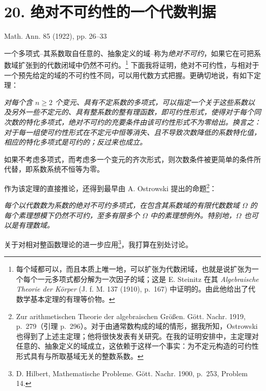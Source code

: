 \setcounter{footnote}{0}
\section*{20. 绝对不可约性的一个代数判据}
\begin{center}
Math. Ann. 85 (1922), pp. 26--33
\end{center}

一个多项式--其系数取自任意的、抽象定义的域--称为\emph{绝对不可约}，如果它在可把系数域扩张到的代数闭域中仍然不可约。\footnote{每个域都可以，而且本质上唯一地，可以扩张为代数闭域，也就是说扩张为一个每个一元多项式都分解为一次因子的域；这是 E. Steinitz 在其 \emph{Algebraische Theorie der K\"orper} (J. f. M. 137 (1910), p.~167) 中证明的。由此他给出了代数学基本定理的有理等价物。} 下面我将证明，绝对不可约性，与相对于一个预先给定的域的不可约性不同，可以用代数方式把握。更确切地说，有如下定理：

\emph{对每个含 $n\ge2$ 个变元、具有不定系数的多项式，可以指定一个关于这些系数以及另外一些不定元的、具有整系数的整有理函数，即可约性形式，使得对于每个同次数的特化多项式，绝对不可约的充要条件由该可约性形式不为零给出。换言之：对于每一组使可约性形式在不定元中恒等消失、且不导致次数降低的系数特化值，相应的特化多项式是可约的；反过来也成立。}

如果不考虑多项式，而考虑多一个变元的齐次形式，则次数条件被更简单的条件所代替，即系数系统不恒等为零。

作为该定理的直接推论，还得到最早由 A. Ostrowski 提出的命题\footnote{Zur arithmetischen Theorie der algebraischen Gr\"o{\ss}en. G\"ott. Nachr. 1919, p.~279（引理 p.~296）。对于由通常数构成的域的情形，据我所知，Ostrowski 也得到了上述主定理；他将很快发表有关研究。在我的证明安排中，主定理对任意的、抽象定义的域成立，这依赖于这样一个事实：为不定元构造的可约性形式具有与所取基域无关的整数系数。}：

\emph{每个以代数数为系数的绝对不可约多项式，在包含其系数域的有限代数数域 $\Omega$ 的每个素理想模下仍然不可约，至多有限多个 $\Omega$ 中的素理想例外。特别地，$\Omega$ 也可以是有理数域。}

关于对相对整函数理论的进一步应用\footnote{D. Hilbert, Mathematische Probleme. G\"ott. Nachr. 1900, p.~253, Problem 14.}，我打算在别处讨论。

